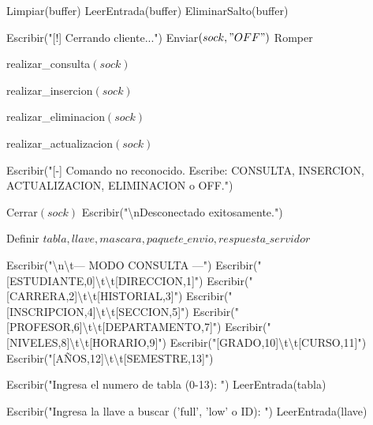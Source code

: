 \begin{tcolorbox}[colback=white, colframe=azul_unam, 
title=Pseudocódigo: cliente.c, breakable]
\begin{algorithmic}[1]
    \State Limpiar(buffer)
    \State LeerEntrada(buffer)
    \State EliminarSalto(buffer)

        \State Escribir("[!] Cerrando cliente...")
        \State Enviar$(sock, "OFF")$
        \State Romper

        \State realizar\_consulta$(sock)$

        \State realizar\_insercion$(sock)$

        \State realizar\_eliminacion$(sock)$

        \State realizar\_actualizacion$(sock)$

    \Else
        \State Escribir("[-] Comando no reconocido. Escribe: CONSULTA, INSERCION, ACTUALIZACION, ELIMINACION o OFF.")
    \EndIf

\EndWhile

\State Cerrar$(sock)$
\State Escribir("\textbackslash nDesconectado exitosamente.")

\State {}

\EndProcedure

\vspace{0.3cm}



\State Definir $tabla, llave, mascara, paquete\_envio, respuesta\_servidor$

\State Escribir("\textbackslash n\textbackslash t--- MODO CONSULTA ---")
\State Escribir("[ESTUDIANTE,0]\textbackslash t\textbackslash t[DIRECCION,1]")
\State Escribir("[CARRERA,2]\textbackslash t\textbackslash t[HISTORIAL,3]")
\State Escribir("[INSCRIPCION,4]\textbackslash t\textbackslash t[SECCION,5]")
\State Escribir("[PROFESOR,6]\textbackslash t\textbackslash t[DEPARTAMENTO,7]")
\State Escribir("[NIVELES,8]\textbackslash t\textbackslash t[HORARIO,9]")
\State Escribir("[GRADO,10]\textbackslash t\textbackslash t[CURSO,11]")
\State Escribir("[AÑOS,12]\textbackslash t\textbackslash t[SEMESTRE,13]")

\State Escribir("Ingresa el numero de tabla (0-13): ")
\State LeerEntrada(tabla)

\State Escribir("Ingresa la llave a buscar ('full', 'low' o ID): ")
\State LeerEntrada(llave)


\end{algorithmic}
\end{tcolorbox}

